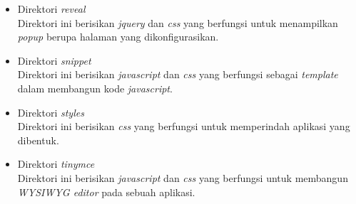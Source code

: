 \begin{itemize}
	\item Direktori \textit{reveal} \\Direktori ini berisikan \textit{jquery} dan \textit{css} yang berfungsi untuk menampilkan \textit{popup} berupa halaman yang dikonfigurasikan.
	\item Direktori \textit{snippet} \\Direktori ini berisikan \textit{javascript} dan \textit{css} yang berfungsi sebagai \textit{template} dalam membangun kode \textit{javascript}.
	\item Direktori \textit{styles} \\Direktori ini berisikan \textit{css} yang berfungsi untuk memperindah aplikasi yang dibentuk.
	\item Direktori \textit{tinymce} \\Direktori ini berisikan \textit{javascript} dan \textit{css} yang berfungsi untuk membangun \textit{WYSIWYG editor} pada sebuah aplikasi.
\end{itemize}

